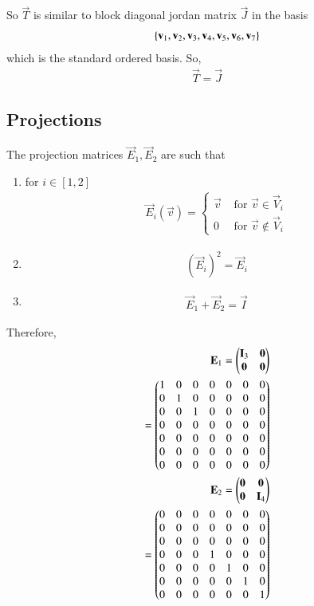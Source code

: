 \documentclass[journal,12pt,twocolumn]{IEEEtran}
\begin{document}
So $\vec{T}$ is similar to block diagonal jordan matrix $\vec{J}$ in the basis 
\begin{align}
    \left\{\mathbf{v}_1,\mathbf{v}_2,\mathbf{v}_3,\mathbf{v}_4,\mathbf{v}_5,\mathbf{v}_6,\mathbf{v}_7\right\}
\end{align}
which is the standard ordered basis. So,
\begin{align}
   \vec{T}=\vec{J} 
\end{align}
\subsection{Projections}
The projection matrices $\vec{E}_1,\vec{E}_2$ are such that

   \begin{enumerate}
       \item for $i \in [1,2]$\begin{align}
           \vec{E}_i(\vec{v})=\begin{cases}
          \vec{v} & \text{ for }  \vec{v} \in \vec{V}_i\\
          0 & \text{ for } \vec{v} \notin \vec{V}_i
       \end{cases}
       \end{align}
       \item \begin{align}
           (\vec{E}_i)^2=\vec{E}_i
       \end{align}
       \item \begin{align}
           \vec{E}_1+\vec{E}_2=\vec{I}
       \end{align}
   \end{enumerate} 
Therefore,
\begin{align}
    \mathbf{E}_1=\begin{pmatrix}\mathbf{I}_3&\mathbf{0}\\\mathbf{0}&\mathbf{0}\end{pmatrix}\\
    =\begin{pmatrix}1&0&0&0&0&0&0\\0&1&0&0&0&0&0\\0&0&1&0&0&0&0\\0&0&0&0&0&0&0\\0&0&0&0&0&0&0\\0&0&0&0&0&0&0\\0&0&0&0&0&0&0\end{pmatrix}\\
     \mathbf{E}_2=\begin{pmatrix}\mathbf{0}&\mathbf{0}\\\mathbf{0}&\mathbf{I}_4\end{pmatrix}\\
     =\begin{pmatrix}0&0&0&0&0&0&0\\0&0&0&0&0&0&0\\0&0&0&0&0&0&0\\0&0&0&1&0&0&0\\0&0&0&0&1&0&0\\0&0&0&0&0&1&0\\0&0&0&0&0&0&1\end{pmatrix}
\end{align}
\end{document}
